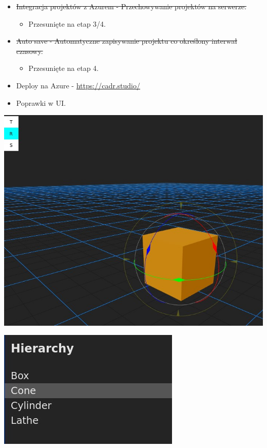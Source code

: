 \documentclass[11pt]{article}
\begin{document}
\begin{itemize}
\item \sout{Integracja projektów z Azurem - Przechowywanie projektów na serwerze.}
\begin{itemize}
\item Przesunięte na etap 3/4.
\end{itemize}
\item \sout{Auto save - Automatyczne zapisywanie projektu co określony interwał czasowy.}
\begin{itemize}
\item Przesunięte na etap 4.
\end{itemize}
\item Deploy na Azure - \url{https://cadr.studio/}
\item Poprawki w UI.
\end{itemize}
\begin{center}
\includegraphics[width=.9\linewidth]{./img/toolbar.jpg}
\end{center}
\begin{center}
\includegraphics[width=.9\linewidth]{./img/hierarchy.jpg}
\end{center}
\end{document}
